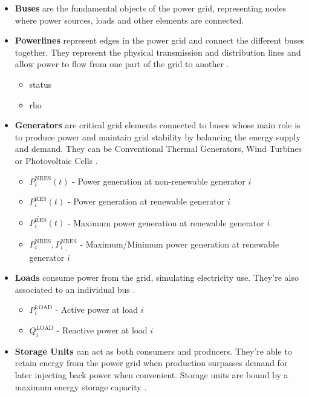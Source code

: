 \begin{itemize}
	\item \textbf{Buses} are the fundamental objects of the power grid, representing nodes where power sources, loads and other elements are connected\cite{rtefranceGrid2OpDocumentation}.
	
	\item \textbf{Powerlines} represent edges in the power grid and connect the different buses together. They represent the physical transmission and distribution lines and allow power to flow from one part of the grid to another \cite{rtefranceGrid2OpDocumentation}.
	\begin{itemize}
		\item status
		\item rho
	\end{itemize}
	
	\item \textbf{Generators} are critical grid elements connected to buses whose main role is to produce power and maintain grid stability by balancing the energy supply and demand. They can be Conventional Thermal Generators, Wind Turbines or Photovoltaic Cells \cite{rtefranceGrid2OpDocumentation}.
	\begin{itemize}
		\item $P^\text{NRES}_i(t)$ - Power generation at non-renewable generator $i$
		\item $P^\text{RES}_i(t)$ - Power generation at renewable generator $i$
		\item $\overline{P^\text{RES}_i}(t)$ - Maximum power generation at renewable generator $i$
		\item $\overline{P^\text{NRES}_i}, \underline{P^\text{NRES}_i}$ - Maximum/Minimum power generation at renewable generator $i$
	\end{itemize}
	
	
	\item \textbf{Loads} consume power from the grid, simulating electricity use. They're also associated to an individual bus \cite{rtefranceGrid2OpDocumentation}.
	\begin{itemize}
		\item $P^\text{LOAD}_i$ - Active power at load $i$
		\item $Q^\text{LOAD}_i$ - Reactive power at load $i$
	\end{itemize}
	
	\item \textbf{Storage Units} can act as both consumers and producers. They're able to retain energy from the power grid when production surpasses demand for later injecting back power when convenient. Storage units are bound by a maximum energy storage capacity \cite{rtefranceGrid2OpDocumentation}.
\end{itemize}


